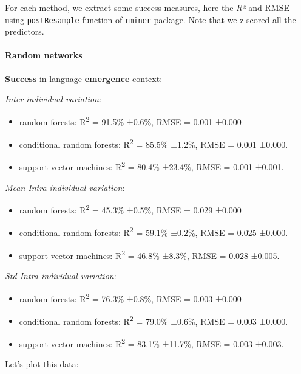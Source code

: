 \documentclass[
]{article}
\providecommand{\tightlist}{%
  \setlength{\itemsep}{0pt}\setlength{\parskip}{0pt}}
\begin{document}
For each method, we extract some success measures, here the \emph{R²}
and RMSE using \texttt{postResample} function of \texttt{rminer}
package. Note that we z-scored all the predictors.

\hypertarget{random-networks}{%
\paragraph{Random networks}\label{random-networks}}

\textbf{Success} in language \textbf{emergence} context:

\emph{Inter-individual variation}:

\begin{itemize}
\tightlist
\item
  random forests: R\textsuperscript{2} = 91.5\% ±0.6\%, RMSE = 0.001
  ±0.000
\item
  conditional random forests: R\textsuperscript{2} = 85.5\% ±1.2\%, RMSE
  = 0.001 ±0.000.
\item
  support vector machines: R\textsuperscript{2} = 80.4\% ±23.4\%, RMSE =
  0.001 ±0.001.
\end{itemize}

\emph{Mean Intra-individual variation}:

\begin{itemize}
\tightlist
\item
  random forests: R\textsuperscript{2} = 45.3\% ±0.5\%, RMSE = 0.029
  ±0.000
\item
  conditional random forests: R\textsuperscript{2} = 59.1\% ±0.2\%, RMSE
  = 0.025 ±0.000.
\item
  support vector machines: R\textsuperscript{2} = 46.8\% ±8.3\%, RMSE =
  0.028 ±0.005.
\end{itemize}

\emph{Std Intra-individual variation}:

\begin{itemize}
\tightlist
\item
  random forests: R\textsuperscript{2} = 76.3\% ±0.8\%, RMSE = 0.003
  ±0.000
\item
  conditional random forests: R\textsuperscript{2} = 79.0\% ±0.6\%, RMSE
  = 0.003 ±0.000.
\item
  support vector machines: R\textsuperscript{2} = 83.1\% ±11.7\%, RMSE =
  0.003 ±0.003.
\end{itemize}

Let's plot this data:
\end{document}
